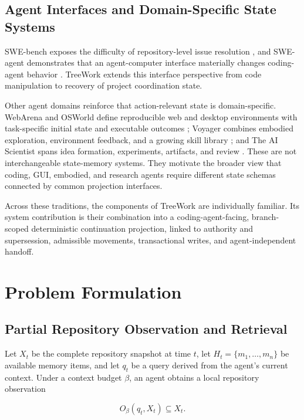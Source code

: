 \documentclass[11pt]{article}
\theoremstyle{definition}
\begin{document}
\subsection{Agent Interfaces and Domain-Specific State Systems}

SWE-bench exposes the difficulty of repository-level issue resolution
\citep{jimenez2023swebench}, and SWE-agent demonstrates that an agent-computer
interface materially changes coding-agent behavior \citep{yang2024sweagent}.
TreeWork extends this interface perspective from code manipulation to recovery
of project coordination state.

Other agent domains reinforce that action-relevant state is domain-specific.
WebArena and OSWorld define reproducible web and desktop environments with
task-specific initial state and executable outcomes
\citep{zhou2023webarena,xie2024osworld}; Voyager combines embodied exploration,
environment feedback, and a growing skill library \citep{wang2023voyager}; and
The AI Scientist spans idea formation, experiments, artifacts, and review
\citep{lu2024aiscientist}.  These are not interchangeable state-memory systems.
They motivate the broader view that coding, GUI, embodied, and research agents
require different state schemas connected by common projection interfaces.

Across these traditions, the components of TreeWork are individually familiar.
Its system contribution is their combination into a coding-agent-facing,
branch-scoped deterministic continuation projection, linked to authority and
supersession, admissible movements, transactional writes, and agent-independent
handoff.

\section{Problem Formulation}
\label{sec:problem}

\subsection{Partial Repository Observation and Retrieval}

Let $X_t$ be the complete repository snapshot at time $t$, let
$H_t=\{m_1,\ldots,m_n\}$ be available memory items, and let $q_t$ be a query
derived from the agent's current context.  Under a context budget $\beta$, an
agent obtains a local repository observation

\begin{equation}
  O_\beta(q_t,X_t)\subseteq X_t.
  \label{eq:repository-observation}
\end{equation}
\end{document}
